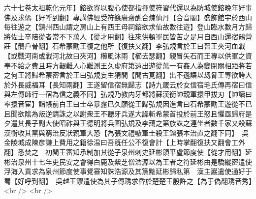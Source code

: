六十七卷太祖乾化元年】鎔欲寄以腹心使都指揮使符習代還以為防城使鎔晚年好事佛及求僊【好呼到翻】專講佛經受符籙廣齋醮合煉仙丹【合音閤】盛飾館宇於西山每往遊之【鎮州西山謂之房山上有西王母祠鎔欲求仙故數往遊】登山臨水數月方歸將佐士卒陪從者常不下萬人【從才用翻】往來供頓軍民皆苦之是月自西山還宿鶻營莊【鶻戶骨翻】石希蒙勸王復之他所【復扶又翻】李弘規言於王曰晉王夾河血戰【或戰河南或戰河北故曰夾河】櫛風沐雨【櫛去瑟翻】親冒矢石而王專以供軍之資奉不給之費且時方艱難人心難測王久虚府第遠出遊從萬一有姦人為變閉關相距將若之何王將歸希蒙密言於王曰弘規妄生猜間【間古莧翻】出不遜語以刼脅王專欲誇大於外長威福耳【長知兩翻】王遂留信宿無歸志【詩九罭云於女信宿毛氏傳再宿曰信與左傳師行一宿為信之義不同】弘規乃教内牙都將蘇漢衡帥親軍擐甲拔刃【帥讀曰率擐音宦】詣帳前白王曰士卒暴露已久願從王歸弘規因進言曰石希蒙勸王遊從不已且聞欲隂為叛逆請誅之以謝衆王不聽牙兵遂大譟斬希蒙首投於前王怒且懼亟歸府是夕遣其長子副大使昭祚與王德明將兵圍弘規及李藹之第族誅之連坐者數千家又殺蘇漢衡收其黨與窮治反狀親軍大恐【為張文禮嗾軍士殺王鎔張本治直之翻下同】　吳金陵城成陳彦謙上費用之籍徐温曰吾旣任公不復會計【上時掌翻復扶又翻會工外翻】悉焚之　初閩王審知承制加其從子泉州刺史延彬領平盧節度使【從才用翻】延彬治泉州十七年吏民安之會得白鹿及紫芝僧浩源以為王者之符延彬由是驕縱密遣使浮海入貢求為泉州節度使事覺審知誅浩源及其黨黜延彬歸私第　漢主巖遣使通好于蜀【好呼到翻】　吳越王鏐遣使為其子傳琇求昏於楚楚王殷許之【為于偽翻琇音秀】<br />
<br />
